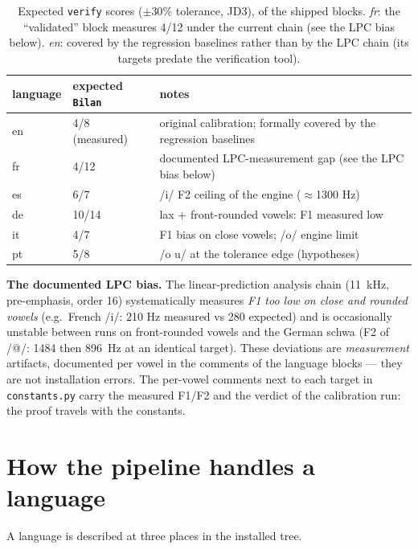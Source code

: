 \documentclass[11pt,a4paper]{article}
\newcommand{\code}[1]{\texttt{#1}}
\begin{document}
\begin{table}[htbp]
\centering
\caption{Expected \code{verify} scores ($\pm30\%$ tolerance, JD3),
of the shipped blocks. \emph{fr}: the ``validated'' block
measures 4/12 under the current chain (see the LPC bias below).
\emph{en}: covered by the regression baselines rather than by the
LPC chain (its targets predate the verification tool).}
\label{tab:verdicts}
\begin{tabular}{lll}
\toprule
language & expected \code{Bilan} & notes \\
\midrule
en & 4/8 (measured) & original calibration; formally covered by the
regression baselines \\
fr & 4/12 & documented LPC-measurement gap (see the LPC bias below) \\
es & 6/7 & /i/ F2 ceiling of the engine ($\approx$1300 Hz) \\
de & 10/14 & lax + front-rounded vowels: F1 measured low \\
it & 4/7 & F1 bias on close vowels; /o/ engine limit \\
pt & 5/8 & /o u/ at the tolerance edge (hypotheses) \\
\bottomrule
\end{tabular}
\end{table}

\textbf{The documented LPC bias.} The linear-prediction analysis
chain (11~kHz, pre-emphasis, order 16) systematically measures
\emph{F1 too low on close and rounded vowels} (e.g.\ French /i/: 210
Hz measured vs 280 expected) and is occasionally unstable between
runs on front-rounded vowels and the German schwa (F2 of /@/: 1484
then 896~Hz at an identical target). These deviations are
\emph{measurement} artifacts, documented per vowel in the comments of
the language blocks --- they are not installation errors. The
per-vowel comments next to each target in \code{constants.py} carry
the measured F1/F2 and the verdict of the calibration run: the proof
travels with the constants.

\section{How the pipeline handles a language}
\label{sec:pipeline}

A language is described at three places in the installed tree.
\end{document}
